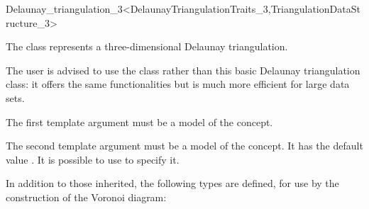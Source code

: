 

\begin{ccRefClass}{Delaunay_triangulation_3<DelaunayTriangulationTraits_3,TriangulationDataStructure_3>}

\ccDefinition
  
The class  represents a three-dimensional
Delaunay triangulation.

The user is advised to use the class  rather
than this basic Delaunay triangulation class: it offers the same
functionalities but is much more efficient for large data sets.


\ccParameters

The first template argument must be a model of the
 concept.

The second template argument must be a model of the
 concept.
It has the default value .
It is possible to use  to specify it.


\ccTypes

\ccThreeToTwo
In addition to those inherited, the following types are defined, for use by the
construction of the Voronoi diagram:

\ccGlue
{}
\ccGlue
{}
\ccGlue
{}

\ccCreation
{}


\end{ccRefClass}
